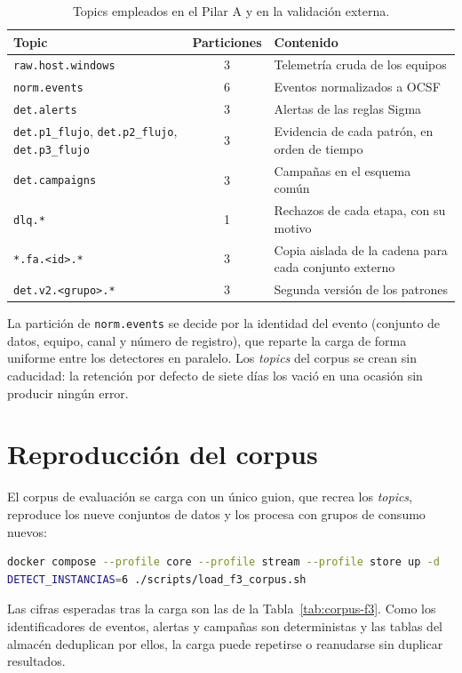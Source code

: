 \begin{table}[H]
\centering
\small
\begin{tabular}{|l|c|l|}
\hline
\textbf{Topic} & \textbf{Particiones} & \textbf{Contenido} \\
\hline
\texttt{raw.host.windows} & 3 & Telemetría cruda de los equipos \\
\texttt{norm.events} & 6 & Eventos normalizados a OCSF \\
\texttt{det.alerts} & 3 & Alertas de las reglas Sigma \\
\texttt{det.p1\_flujo}, \texttt{det.p2\_flujo}, \texttt{det.p3\_flujo} & 3 & Evidencia de cada patrón, en orden de tiempo \\
\texttt{det.campaigns} & 3 & Campañas en el esquema común \\
\texttt{dlq.*} & 1 & Rechazos de cada etapa, con su motivo \\
\texttt{*.fa.<id>.*} & 3 & Copia aislada de la cadena para cada conjunto externo \\
\texttt{det.v2.<grupo>.*} & 3 & Segunda versión de los patrones \\
\hline
\end{tabular}
\caption{Topics empleados en el Pilar A y en la validación externa.}
\end{table}

La partición de \texttt{norm.events} se decide por la identidad del evento (conjunto de
datos, equipo, canal y número de registro), que reparte la carga de forma uniforme entre los
detectores en paralelo. Los \textit{topics} del corpus se crean sin caducidad: la retención
por defecto de siete días los vació en una ocasión sin producir ningún error.

\section{Reproducción del corpus}

El corpus de evaluación se carga con un único guion, que recrea los \textit{topics},
reproduce los nueve conjuntos de datos y los procesa con grupos de consumo nuevos:

\begin{lstlisting}[language=bash,caption={Carga del corpus del Pilar A.},label={lst:carga}]
docker compose --profile core --profile stream --profile store up -d
DETECT_INSTANCIAS=6 ./scripts/load_f3_corpus.sh
\end{lstlisting}

Las cifras esperadas tras la carga son las de la Tabla~\ref{tab:corpus-f3}. Como los
identificadores de eventos, alertas y campañas son deterministas y las tablas del almacén
deduplican por ellos, la carga puede repetirse o reanudarse sin duplicar resultados.
